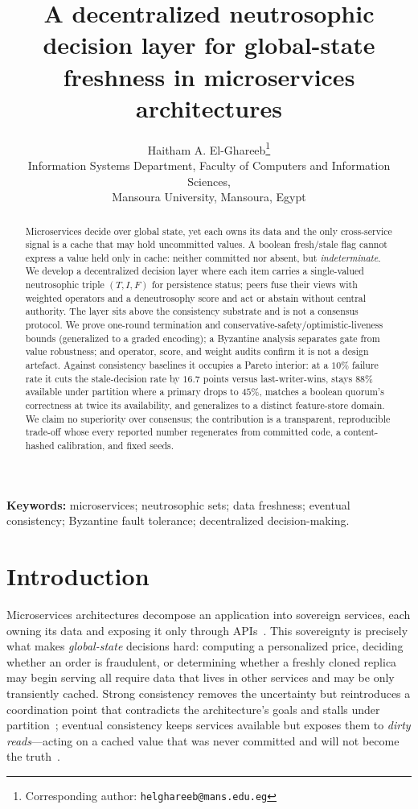 \documentclass[11pt]{article}
\title{A decentralized neutrosophic decision layer for global-state freshness in microservices architectures}
\author{Haitham A. El-Ghareeb\thanks{Corresponding author: \texttt{helghareeb@mans.edu.eg}}\\[2pt]
Information Systems Department, Faculty of Computers and Information Sciences,\\
Mansoura University, Mansoura, Egypt}
\date{}
\begin{document}
\maketitle
\linenumbers

\begin{abstract}
Microservices decide over global state, yet each owns its data and the only cross-service
signal is a cache that may hold uncommitted values. A boolean fresh/stale flag cannot express a value
held only in cache: neither committed nor absent, but \emph{indeterminate}. We develop a decentralized
decision layer where each item carries a single-valued neutrosophic triple $(T,I,F)$ for persistence
status; peers fuse their views with weighted operators and a deneutrosophy score and act or abstain
without central authority. The layer sits above the consistency substrate and is not a consensus
protocol. We prove one-round termination and conservative-safety/optimistic-liveness bounds (generalized
to a graded encoding); a Byzantine analysis separates gate from value robustness; and operator, score,
and weight audits confirm it is not a design artefact. Against consistency baselines it occupies a
Pareto interior: at a $10\%$ failure rate it cuts the stale-decision rate by $16.7$ points versus
last-writer-wins, stays $88\%$ available under partition where a primary drops to $45\%$, matches a
boolean quorum's correctness at twice its availability, and generalizes to a distinct feature-store
domain. We claim no superiority over consensus; the contribution is a transparent, reproducible trade-off
whose every reported number regenerates from committed code, a content-hashed calibration, and fixed
seeds.
\end{abstract}

\noindent\textbf{Keywords:} microservices; neutrosophic sets; data freshness; eventual consistency;
Byzantine fault tolerance; decentralized decision-making.
\bigskip

\section{Introduction}
\label{sec:intro}

Microservices architectures decompose an application into sovereign services, each owning its data
and exposing it only through APIs~\cite{soldani2018pains}. This sovereignty is precisely what makes
\emph{global-state} decisions hard: computing a personalized price, deciding whether an order is
fraudulent, or determining whether a freshly cloned replica may begin serving all require data that
lives in other services and may be only transiently cached. Strong consistency removes the
uncertainty but reintroduces a coordination point that contradicts the architecture's goals and
stalls under partition~\cite{pardon2018bac,abadi2012consistency}; eventual consistency keeps
services available but exposes them to \emph{dirty reads}---acting on a cached value that was never
committed and will not become the truth~\cite{laigner2021data}.
\end{document}
